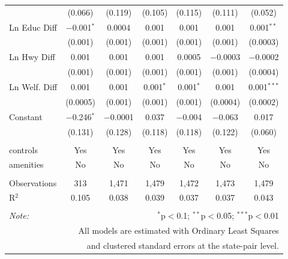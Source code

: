 \begin{table}[!htbp]
\begin{tabular}{@{\extracolsep{5pt}}lcccccc}
  & (0.066) & (0.119) & (0.105) & (0.115) & (0.111) & (0.052) \\ 
  Ln Educ Diff & $-$0.001$^{*}$ & 0.0004 & 0.001 & 0.001 & 0.001 & 0.001$^{**}$ \\ 
  & (0.001) & (0.001) & (0.001) & (0.001) & (0.001) & (0.0003) \\ 
  Ln Hwy Diff & 0.001 & 0.001 & 0.001 & 0.0005 & $-$0.0003 & $-$0.0002 \\ 
  & (0.001) & (0.001) & (0.001) & (0.001) & (0.001) & (0.0004) \\ 
  Ln Welf. Diff & 0.001 & 0.001 & 0.001$^{*}$ & 0.001$^{*}$ & 0.001 & 0.001$^{***}$ \\ 
  & (0.0005) & (0.001) & (0.001) & (0.001) & (0.0004) & (0.0002) \\ 
  Constant & $-$0.246$^{*}$ & $-$0.0001 & 0.037 & $-$0.004 & $-$0.063 & 0.017 \\ 
  & (0.131) & (0.128) & (0.118) & (0.118) & (0.122) & (0.060) \\ 
 \hline \\[-1.8ex] 
controls & Yes & Yes & Yes & Yes & Yes & Yes \\ 
amenities & No & No & No & No & No & No \\ 
\hline \\[-1.8ex] 
Observations & 313 & 1,471 & 1,479 & 1,472 & 1,473 & 1,479 \\ 
R$^{2}$ & 0.105 & 0.038 & 0.039 & 0.037 & 0.037 & 0.043 \\ 
\hline 
\hline \\[-1.8ex] 
\textit{Note:}  & \multicolumn{6}{r}{$^{*}$p$<$0.1; $^{**}$p$<$0.05; $^{***}$p$<$0.01} \\ 
 & \multicolumn{6}{r}{All models are estimated with Ordinary Least Squares} \\ 
 & \multicolumn{6}{r}{and clustered standard errors at the state-pair level.} \\ 
\end{tabular} 
\end{table} 
